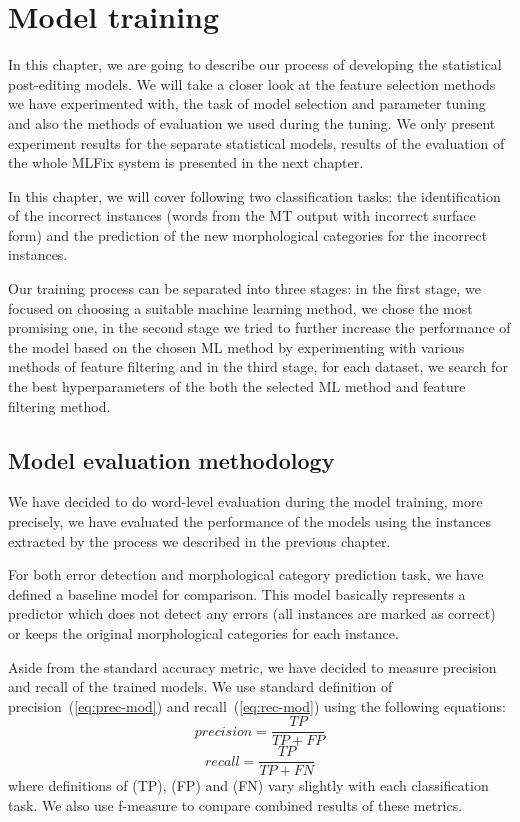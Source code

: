 \chapter{Model training}
\label{chap:tuning}

In this chapter, we are going to describe our process of developing
the statistical post-editing models. We will take a closer look at the feature selection
methods we have experimented with, the task of model selection and parameter
tuning and also the methods of evaluation we used during the tuning.
We only present experiment results for the separate statistical models,
results of the evaluation of the whole MLFix system is presented in the next chapter.

In this chapter, we will cover following two classification tasks: the identification
of the incorrect instances (words from the MT output with incorrect surface form)
and the prediction of the new morphological categories for the incorrect instances.

Our training process can be separated into three stages: in the first stage, we
focused on choosing a suitable machine learning method, we chose the most promising
one, in the second stage we tried to further increase the performance of the model
based on the chosen ML method by experimenting with various methods of feature filtering
and in the third stage, for each dataset, we search for the best hyperparameters
of the both the selected ML method and feature filtering method.


\section{Model evaluation methodology}

We have decided to do word-level evaluation during the model training, more precisely,
we have evaluated the performance of the models using the instances extracted by the
process we described in the previous chapter.

For both error detection and morphological category prediction task, we have defined
a baseline model for comparison. This model basically represents a predictor which
does not detect any errors (all instances are marked as correct) or keeps the original
morphological categories for each instance.

Aside from the standard accuracy metric, we have decided to measure precision and recall
of the trained models. We use standard definition of precision~(\ref{eq:prec-mod}) and recall~(\ref{eq:rec-mod}) using the following equations:
\begin{equation} \label{eq:prec-mod}
precision = \frac{TP}{TP + FP}
\end{equation}
\begin{equation} \label{eq:rec-mod}
recall = \frac{TP}{TP + FN}
\end{equation}
where definitions of  (TP),  (FP) and  (FN)
vary slightly with each classification task. We also use f-measure to compare combined results of these metrics.


